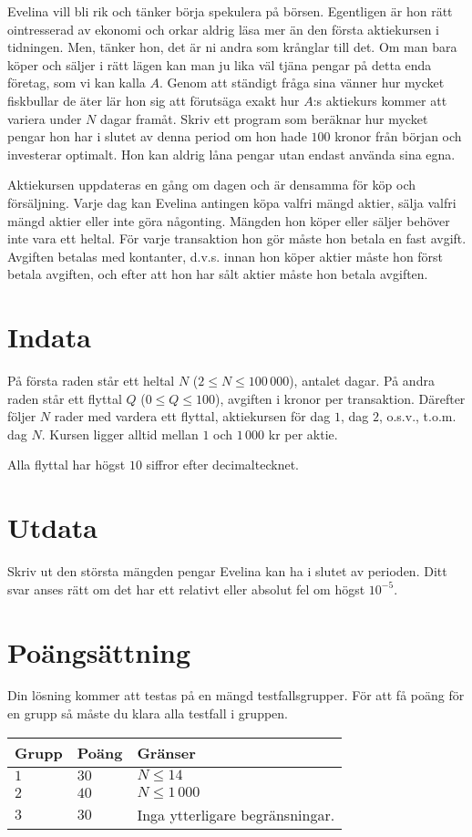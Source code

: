 Evelina vill bli rik och tänker börja spekulera på börsen.
Egentligen är hon rätt ointresserad av ekonomi och orkar aldrig läsa mer än den första aktiekursen i tidningen.
Men, tänker hon, det är ni andra som krånglar till det.
Om man bara köper och säljer i rätt lägen kan man ju lika väl tjäna pengar på detta enda företag, som vi kan kalla $A$.
Genom att ständigt fråga sina vänner hur mycket fiskbullar de äter lär hon sig att förutsäga exakt hur $A$:s aktiekurs kommer att variera under $N$ dagar framåt.
Skriv ett program som beräknar hur mycket pengar hon har i slutet av denna period om hon hade $100$ kronor från början och investerar optimalt.
Hon kan aldrig låna pengar utan endast använda sina egna.

Aktiekursen uppdateras en gång om dagen och är densamma för köp och försäljning.
Varje dag kan Evelina antingen köpa valfri mängd aktier, sälja valfri mängd aktier eller inte göra någonting.
Mängden hon köper eller säljer behöver inte vara ett heltal.
För varje transaktion hon gör måste hon betala en fast avgift.
Avgiften betalas med kontanter, d.v.s. innan hon köper aktier måste hon först betala avgiften, och efter att hon har sålt aktier måste hon betala avgiften. 

\section*{Indata}
På första raden står ett heltal $N$ ($2 \le N \le 100\,000$), antalet dagar.
På andra raden står ett flyttal $Q$ ($0 \le Q \le 100$), avgiften i kronor per transaktion.
Därefter följer $N$ rader med vardera ett flyttal, aktiekursen för dag $1$, dag $2$, o.s.v., t.o.m. dag $N$.
Kursen ligger alltid mellan $1$ och $1\,000$ kr per aktie. 

Alla flyttal har högst $10$ siffror efter decimaltecknet.

\section*{Utdata}
Skriv ut den största mängden pengar Evelina kan ha i slutet av perioden.
Ditt svar anses rätt om det har ett relativt eller absolut fel om högst $10^{-5}$.

\section*{Poängsättning}
Din lösning kommer att testas på en mängd testfallsgrupper.
För att få poäng för en grupp så måste du klara alla testfall i gruppen.

\noindent
\begin{tabular}{| l | l | p{12cm} |}
  \hline
  \textbf{Grupp} & \textbf{Poäng} & \textbf{Gränser} \\ \hline
  $1$    & $30$        & $N \le 14$ \\ \hline 
  $2$    & $40$        & $N \le 1\,000$ \\ \hline
  $3$    & $30$        & Inga ytterligare begränsningar. \\ \hline 
\end{tabular}
